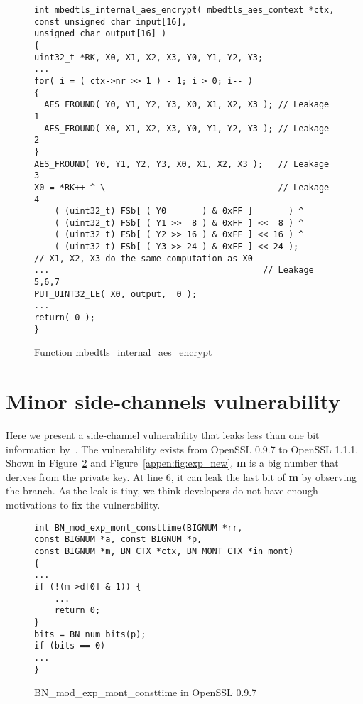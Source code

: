 \begin{figure}[h!]
    \centering
    \begin{lstlisting}[xleftmargin=.01\textwidth,xrightmargin=.01\textwidth]
int mbedtls_internal_aes_encrypt( mbedtls_aes_context *ctx,
const unsigned char input[16],
unsigned char output[16] )
{
uint32_t *RK, X0, X1, X2, X3, Y0, Y1, Y2, Y3;
...
for( i = ( ctx->nr >> 1 ) - 1; i > 0; i-- )
{
  AES_FROUND( Y0, Y1, Y2, Y3, X0, X1, X2, X3 ); // Leakage 1
  AES_FROUND( X0, X1, X2, X3, Y0, Y1, Y2, Y3 ); // Leakage 2
}
AES_FROUND( Y0, Y1, Y2, Y3, X0, X1, X2, X3 );   // Leakage 3
X0 = *RK++ ^ \                                  // Leakage 4
    ( (uint32_t) FSb[ ( Y0       ) & 0xFF ]       ) ^
    ( (uint32_t) FSb[ ( Y1 >>  8 ) & 0xFF ] <<  8 ) ^
    ( (uint32_t) FSb[ ( Y2 >> 16 ) & 0xFF ] << 16 ) ^
    ( (uint32_t) FSb[ ( Y3 >> 24 ) & 0xFF ] << 24 );
// X1, X2, X3 do the same computation as X0
...                                          // Leakage 5,6,7
PUT_UINT32_LE( X0, output,  0 );
...
return( 0 );
}
\end{lstlisting}
    \vspace*{-6pt}
    \caption{Function \textsf{mbedtls\_internal\_aes\_encrypt}}
    \label{mbedtls_aes}
    \vspace*{-9pt}
\end{figure}

\section{Minor side-channels vulnerability}
\label{appendix:minor:vul}
Here we present a side-channel vulnerability that leaks
less than one bit information by~\tool{}. The vulnerability exists
from OpenSSL 0.9.7 to OpenSSL 1.1.1. Shown in Figure~\ref{appen:fig:exp} 
and Figure~\ref{appen:fig:exp_new}, \textbf{m} is a big number that
derives from the private key.
At line 6, it can leak the last bit of \textbf{m} by observing the branch. 
As the leak is tiny,
we think developers do not have enough motivations
to fix the vulnerability.

\begin{figure}[h]
\centering
\begin{lstlisting}[xleftmargin=.02\textwidth,xrightmargin=.01\textwidth]
int BN_mod_exp_mont_consttime(BIGNUM *rr, 
const BIGNUM *a, const BIGNUM *p,
const BIGNUM *m, BN_CTX *ctx, BN_MONT_CTX *in_mont)
{
... 
if (!(m->d[0] & 1)) {
    ... 
    return 0;
}
bits = BN_num_bits(p);
if (bits == 0) 
...
}
\end{lstlisting}
    \vspace*{-6pt}
    \caption{\textsf{BN\_mod\_exp\_mont\_consttime} in OpenSSL 0.9.7}
    \label{appen:fig:exp}
    \vspace*{-6pt}
\end{figure}



